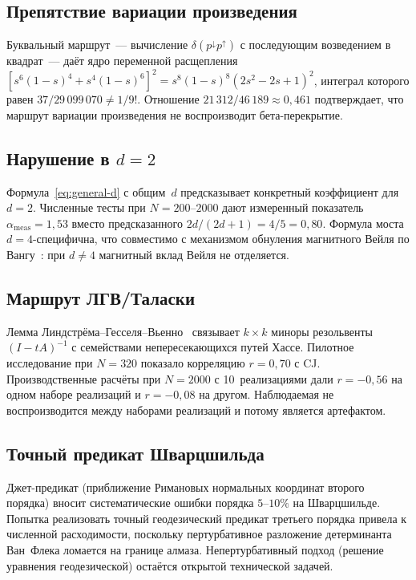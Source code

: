\documentclass[12pt,a4paper]{article}
\theoremstyle{plain}
\theoremstyle{definition}
\theoremstyle{remark}
\begin{document}
\subsection{Препятствие вариации произведения}
\label{sec:product-nogo}

Буквальный маршрут~--- вычисление
$\delta(p^{\downarrow} p^{\uparrow})$ с последующим
возведением в квадрат~--- даёт ядро переменной расщепления
$[s^6(1-s)^4 + s^4(1-s)^6]^2 = s^8(1-s)^8(2s^2 - 2s + 1)^2$,
интеграл которого равен $37/29\,099\,070 \neq 1/9!$.
Отношение $21\,312/46\,189 \approx 0{,}461$ подтверждает,
что маршрут вариации произведения не воспроизводит
бета-перекрытие.

\subsection{Нарушение в $d = 2$}
\label{sec:d2fail}

Формула~\eqref{eq:general-d} с общим~$d$ предсказывает
конкретный коэффициент для $d = 2$.  Численные тесты при
$N = 200$--$2000$ дают измеренный показатель
$\alpha_{\mathrm{meas}} = 1{,}53$ вместо предсказанного
$2d/(2d+1) = 4/5 = 0{,}80$.  Формула моста
$d = 4$-специфична, что совместимо с механизмом обнуления
магнитного Вейля по Вангу~\cite{Wang:2019}: при $d \neq 4$
магнитный вклад Вейля не отделяется.

\subsection{Маршрут ЛГВ/Таласки}
\label{sec:lgv}

Лемма
Линдстрёма--Гесселя--Вьенно~\cite{GesselViennot:1985}
связывает $k \times k$ миноры резольвенты $(I - tA)^{-1}$
с семействами непересекающихся путей Хассе.  Пилотное
исследование при $N = 320$ показало корреляцию
$r = 0{,}70$ с CJ.  Производственные расчёты при $N = 2000$
с 10~реализациями дали $r = -0{,}56$ на одном наборе
реализаций и $r = -0{,}08$ на другом.  Наблюдаемая не
воспроизводится между наборами реализаций и потому является
артефактом.

\subsection{Точный предикат Шварцшильда}
\label{sec:exact-sch}

Джет-предикат (приближение Римановых нормальных координат
второго порядка) вносит систематические ошибки порядка
$5$--$10\%$ на Шварцшильде.  Попытка реализовать точный
геодезический предикат третьего порядка привела к численной
расходимости, поскольку пертурбативное разложение
детерминанта Ван~Флека ломается на границе алмаза.
Непертурбативный подход (решение уравнения геодезической)
остаётся открытой технической задачей.
\end{document}
